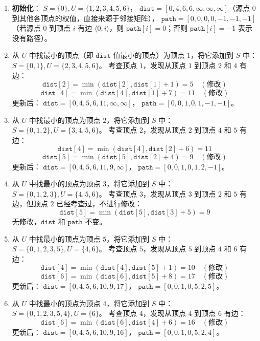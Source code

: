 \documentclass[lang=cn,newtx,10pt,scheme=chinese]{elegantbook}
\begin{document}
\begin{enumerate}
  \item \textbf{初始化}：  
  $S = \{0\}, U = \{1, 2, 3, 4, 5, 6\}$，  
  $\texttt{dist} = [0, 4, 6, 6, \infty, \infty, \infty]$（源点 $0$ 到其他各顶点的权值，直接来源于邻接矩阵），  
  $\texttt{path} = [0, 0, 0, 0, -1, -1, -1]$（若源点 $0$ 到顶点 $i$ 有边 $\langle 0, i \rangle$，则 $\texttt{path}[i] = 0$；否则 $\texttt{path}[i] = -1$ 表示没有路径）。

  \item 从 $U$ 中找最小的顶点（即 $\texttt{dist}$ 值最小的顶点）为顶点 $1$，将它添加到 $S$ 中：  
  $S = \{0, 1\}, U = \{2, 3, 4, 5, 6\}$。  
  考查顶点 $1$，发现从顶点 $1$ 到顶点 $2$ 和 $4$ 有边：
  \[
  \texttt{dist}[2] = \min(\texttt{dist}[2], \texttt{dist}[1] + 1) = 5 \quad (\text{修改})
  \]
  \[
  \texttt{dist}[4] = \min(\texttt{dist}[4], \texttt{dist}[1] + 7) = 11 \quad (\text{修改})
  \]
  更新后：  
  $\texttt{dist} = [0, 4, 5, 6, 11, \infty, \infty]$，  
  $\texttt{path} = [0, 0, 1, 0, 1, -1, -1]$。

  \item 从 $U$ 中找最小的顶点为顶点 $2$，将它添加到 $S$ 中：  
  $S = \{0, 1, 2\}, U = \{3, 4, 5, 6\}$。  
  考查顶点 $2$，发现从顶点 $2$ 到顶点 $4$ 和 $5$ 有边：
  \[
  \texttt{dist}[4] = \min(\texttt{dist}[4], \texttt{dist}[2] + 6) = 11
  \]
  \[
  \texttt{dist}[5] = \min(\texttt{dist}[5], \texttt{dist}[2] + 4) = 9 \quad (\text{修改})
  \]
  更新后：  
  $\texttt{dist} = [0, 4, 5, 6, 11, 9, \infty]$，  
  $\texttt{path} = [0, 0, 1, 0, 1, 2, -1]$。

  \item 从 $U$ 中找最小的顶点为顶点 $3$，将它添加到 $S$ 中：  
  $S = \{0, 1, 2, 3\}, U = \{4, 5, 6\}$。  
  考查顶点 $3$，发现从顶点 $3$ 到顶点 $2$ 和 $5$ 有边，但顶点 $2$ 已经考查过，不进行修改：
  \[
  \texttt{dist}[5] = \min(\texttt{dist}[5], \texttt{dist}[3] + 5) = 9
  \]
  无修改，$\texttt{dist}$ 和 $\texttt{path}$ 不变。

  \item 从 $U$ 中找最小的顶点为顶点 $5$，将它添加到 $S$ 中：  
  $S = \{0, 1, 2, 3, 5\}, U = \{4, 6\}$。  
  考查顶点 $5$，发现从顶点 $5$ 到顶点 $4$ 和 $6$ 有边：
  \[
  \texttt{dist}[4] = \min(\texttt{dist}[4], \texttt{dist}[5] + 1) = 10 \quad (\text{修改})
  \]
  \[
  \texttt{dist}[6] = \min(\texttt{dist}[6], \texttt{dist}[5] + 8) = 17 \quad (\text{修改})
  \]
  更新后：  
  $\texttt{dist} = [0, 4, 5, 6, 10, 9, 17]$，  
  $\texttt{path} = [0, 0, 1, 0, 5, 2, 5]$。

  \item 从 $U$ 中找最小的顶点为顶点 $4$，将它添加到 $S$ 中：  
  $S = \{0, 1, 2, 3, 5, 4\}, U = \{6\}$。  
  考查顶点 $4$，发现从顶点 $4$ 到顶点 $6$ 有边：
  \[
  \texttt{dist}[6] = \min(\texttt{dist}[6], \texttt{dist}[4] + 6) = 16 \quad (\text{修改})
  \]
  更新后：  
  $\texttt{dist} = [0, 4, 5, 6, 10, 9, 16]$，  
  $\texttt{path} = [0, 0, 1, 0, 5, 2, 4]$。


\end{enumerate}
\end{document}
